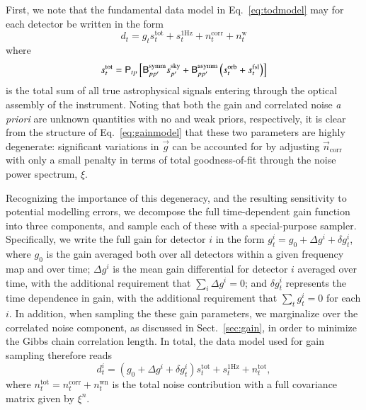 \documentclass[onecolumn]{aa}
\newcommand{\n}[0]{\vec{n}}
\newcommand{\B}[0]{\tens{B}}
\newcommand{\g}[0]{\vec{g}}
\renewcommand{\P}[0]{\tens{P}}
\begin{document}
First, we note that the fundamental data model in
Eq.~\eqref{eq:todmodel} may for each detector be written in the form
\begin{equation}
  d_{t} = g_{t} s^{\mathrm{tot}}_{t} + s^{\mathrm{1Hz}}_{t} + n^{\mathrm{corr}}_{t} + n^{\mathrm{w}}_{t} 
  \label{eq:gainmodel}
\end{equation}
where
\begin{equation}
  s^{\mathrm{tot}}_t = \P_{tp}\left[\B_{pp'}^{\mathrm{symm}}s^{\mathrm{sky}}_{p'} + \B_{pp'}^{\mathrm{asymm}}\left(s^{\mathrm{orb}}_{t}  
  + s^{\mathrm{fsl}}_{t}\right)\right]
  \label{eq:stot}
\end{equation}
is the total sum of all true astrophysical signals entering through
the optical assembly of the instrument. Noting that both the gain and
correlated noise \emph{a priori} are unknown quantities with no and
weak priors, respectively, it is clear from the structure of
Eq.~\eqref{eq:gainmodel} that these two parameters are highly
degenerate: significant variations in $\g$ can be accounted for by
adjusting $\n_{\mathrm{corr}}$ with only a small penalty in terms of
total goodness-of-fit through the noise power spectrum, $\xi$.

Recognizing the importance of this degeneracy, and the resulting
sensitivity to potential modelling errors, we decompose the full
time-dependent gain function into three components, and sample each of
these with a special-purpose sampler. Specifically, we write the full
gain for detector $i$ in the form ${g^i_t = g_0 + \Delta g^i + \delta
  g^i_t}$, where $g_0$ is the gain averaged both over all detectors
within a given frequency map and over time; $\Delta g^i$ is the mean
gain differential for detector $i$ averaged over time, with the
additional requirement that $\sum_i \Delta g^i = 0$; and $\delta
g^i_t$ represents the time dependence in gain, with the additional
requirement that $\sum_t g^i_t = 0$ for each $i$. In addition, when
sampling the these gain parameters, we marginalize over the correlated
noise component, as discussed in Sect.~\ref{sec:gain}, in order to
minimize the Gibbs chain correlation length. In total, the data model
used for gain sampling therefore reads
\begin{equation}
  d^i_{t} = (g_0 + \Delta g^i + \delta g_t^i) s^{\mathrm{tot}}_{t} + s^{\mathrm{1Hz}}_t + n^{\mathrm{tot}}_{t},
  \label{eq:gainmodel2}
\end{equation}
where $n^{\mathrm{tot}}_{t} = n^{\mathrm{corr}}_{t} +
n^{\mathrm{wn}}_{t}$ is the total noise contribution with a full
covariance matrix given by $\xi^n$.
\end{document}

